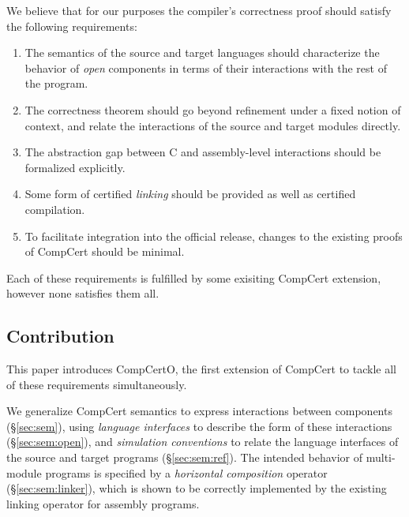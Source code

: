 \documentclass[sigplan,10pt,review,anonymous]{acmart}
\begin{document}
We believe that for our purposes
the compiler's correctness proof
should satisfy the following requirements:
\begin{enumerate}
\item \label{req:opensem}
  The semantics of the source and target languages
  should characterize the behavior of \emph{open} components
  in terms of their interactions with the rest of the program.
\item \label{req:opensim}
  The correctness theorem
  should go beyond refinement under a fixed notion of context, and relate
  the interactions of the source and target modules directly.
\item \label{req:openabs}
  The abstraction gap between C and assembly-level
  interactions should be formalized explicitly.
\item \label{req:linking}
  Some form of certified \emph{linking}
  should be provided as well as certified compilation.
\item \label{req:complexity}
  To facilitate integration into the official release,
  changes to the existing proofs of CompCert
  should be minimal.
\end{enumerate}
Each of these requirements is fulfilled
by some exisiting CompCert extension,
however none satisfies them all.



\subsection{Contribution} %

This paper introduces CompCertO,
the first extension of CompCert to tackle
all of these requirements simultaneously.

We generalize CompCert semantics
to express interactions between components (\S\ref{sec:sem}),
using \emph{language interfaces}
to describe the form of these interactions (\S\ref{sec:sem:open}),
and \emph{simulation conventions}
to relate the language interfaces
of the source and target programs (\S\ref{sec:sem:ref}).
The intended behavior of
multi-module programs is specified by a
\emph{horizontal composition} operator (\S\ref{sec:sem:linker}),
which is shown to be correctly implemented
by the existing linking operator for assembly programs.
\end{document}
